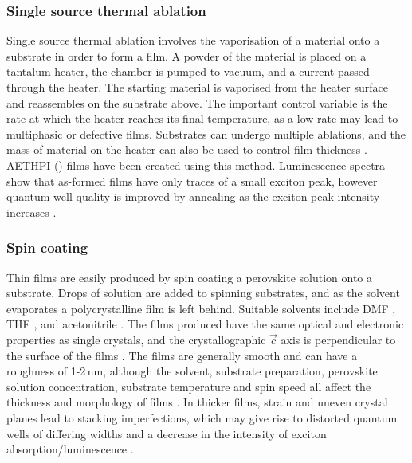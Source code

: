 \subsubsection{Single source thermal ablation}
Single source thermal ablation involves the vaporisation of a material onto a substrate in order to form a film. A powder of the material is placed on a tantalum heater, the chamber is pumped to vacuum, and a current passed through the heater. The starting material is vaporised from the heater surface and reassembles on the substrate above. The important control variable is the rate at which the heater reaches its final temperature, as a low rate may lead to multiphasic or defective films. Substrates can undergo multiple ablations, and the mass of material on the heater can also be used to control film thickness \cite{Mitzi1999}. AETHPI () films have been created using this method. Luminescence spectra show that as-formed films have only traces of a small exciton peak, however quantum well quality is improved by annealing as the exciton peak intensity increases \cite{Chondroudis2000}.

\subsubsection{Spin coating}
Thin films are easily produced by spin coating a perovskite solution onto a substrate. Drops of solution are added to spinning substrates, and as the solvent evaporates a polycrystalline film is left behind. Suitable solvents include DMF \cite{Kikuchi2005}, THF \cite{Kataoka1994}, and acetonitrile \cite{VijayaPrakash2009}. The films produced have the same optical and electronic properties as single crystals, and the crystallographic $\vec{c}$ axis is perpendicular to the surface of the films \cite{Kataoka1993}. The films are generally smooth and can have a roughness of 1-2\,nm, although the solvent, substrate preparation, perovskite solution concentration, substrate temperature and spin speed all affect the thickness and morphology of films \cite{Mitzi2001b}. In thicker films, strain and uneven crystal planes lead to stacking imperfections, which may give rise to distorted quantum wells of differing widths and a decrease in the intensity of exciton absorption/luminescence \cite{VijayaPrakash2009}.

